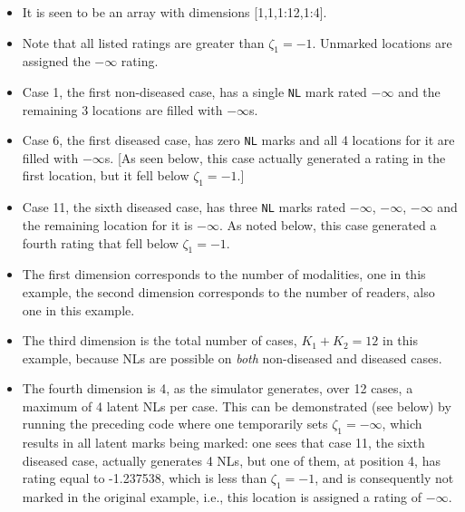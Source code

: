\documentclass[
]{book}
\newenvironment{Shaded}{\begin{snugshade}}{\end{snugshade}}
\newcommand{\CommentTok}[1]{\textcolor[rgb]{0.56,0.35,0.01}{\textit{#1}}}
\newcommand{\DecValTok}[1]{\textcolor[rgb]{0.00,0.00,0.81}{#1}}
\newcommand{\NormalTok}[1]{#1}
\newcommand{\OperatorTok}[1]{\textcolor[rgb]{0.81,0.36,0.00}{\textbf{#1}}}
\begin{document}
\begin{itemize}
\item
  It is seen to be an array with dimensions {[}1,1,1:12,1:4{]}.
\item
  Note that all listed ratings are greater than \(\zeta_1 = -1\). Unmarked locations are assigned the \(-\infty\) rating.
\item
  Case 1, the first non-diseased case, has a single \texttt{NL} mark rated \ensuremath{-\infty{}} and the remaining 3 locations are filled with \(-\infty\)s.
\item
  Case 6, the first diseased case, has zero \texttt{NL} marks and all 4 locations for it are filled with \(-\infty\)s. {[}As seen below, this case actually generated a rating in the first location, but it fell below \(\zeta_1 = -1\).{]}
\item
  Case 11, the sixth diseased case, has three \texttt{NL} marks rated \ensuremath{-\infty{}}, \ensuremath{-\infty{}}, \ensuremath{-\infty{}} and the remaining location for it is \(-\infty\). As noted below, this case generated a fourth rating that fell below \(\zeta_1 = -1\).
\item
  The first dimension corresponds to the number of modalities, one in this example, the second dimension corresponds to the number of readers, also one in this example.
\item
  The third dimension is the total number of cases, \(K_1+K_2 = 12\) in this example, because NLs are possible on \emph{both} non-diseased and diseased cases.
\item
  The fourth dimension is 4, as the simulator generates, over 12 cases, a maximum of 4 latent NLs per case. This can be demonstrated (see below) by running the preceding code where one temporarily sets \(\zeta_1 = -\infty\), which results in all latent marks being marked: one sees that case 11, the sixth diseased case, actually generates 4 NLs, but one of them, at position 4, has rating equal to -1.237538, which is less than \(\zeta_1 = -1\), and is consequently not marked in the original example, i.e., this location is assigned a rating of \(-\infty\).
\end{itemize}

\begin{Shaded}
\end{Shaded}
\end{document}
